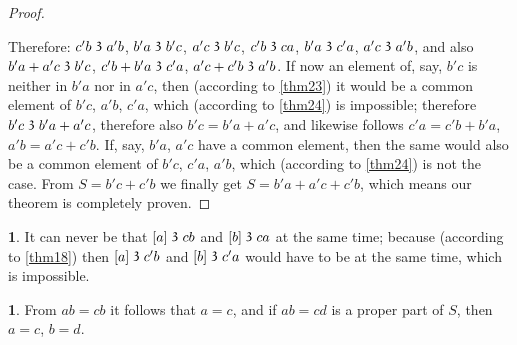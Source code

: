 \documentclass[leqno,hidelinks,a4paper]{article}
\theoremstyle{definition}
\newtheorem{satz}{\protect\satzname}
\newtheorem*{zusatz}{\protect\zusatzname}
\newcommand{\satzname}{}
\newcommand{\zusatzname}{}
\renewcommand{\satzname}{\hspace{-4pt}.\ Satz}%
\renewcommand{\zusatzname}{Zusatz}%
\renewcommand{\satzname}{\hspace{-4pt}.\ Theorem}%
\renewcommand{\zusatzname}{Corollary}%
\newcommand\partof{\mathrel{\raisebox{0.45ex}{$\mathfrak{3}$}}}
\begin{document}
\begin{proof}
\begin{center}
\end{center}

\bigskip

Therefore: $c'b \partof a'b$, $b'a \partof b'c$, $a'c \partof b'c$, $c'b \partof ca$, $b'a \partof c'a$, $a'c \partof a'b$, and also $b'a + a'c \partof b'c$, $c'b + b'a \partof c'a$, $a'c + c'b \partof a'b$.
If now an element of, say, $b'c$ is neither in $b'a$ nor in $a'c$, then (according to \ref{thm23}) it would be a common element of $b'c$, $a'b$, $c'a$, which (according to \ref{thm24}) is impossible; therefore $b'c \partof b'a + a'c$, therefore also $b'c=b'a + a'c$, and likewise follows $c'a=c'b+b'a$, $a'b=a'c+c'b$. If, say, $b'a$, $a'c$ have a common element, then the same would also be a common element of $b'c$, $c'a$, $a'b$, which (according to \ref{thm24}) is not the case.
From $S=b'c+c'b$ we finally get $S=b'a+a'c+c'b$, which means our theorem is completely proven.
\end{proof}

\begin{zusatz}
It can never be that $[a] \partof cb$ and $[b] \partof ca$ at the same time; because (according to \ref{thm18}) then $[a] \partof c'b$ and $[b] \partof c'a$ would have to be at the same time, which is impossible.
\end{zusatz}
\begin{satz}\label{thm26}
From $ab=cb$ it follows that $a=c$, and if $ab=cd$ is a proper part of $S$, then $a=c$, $b = d$.
\end{satz}
\end{document}
